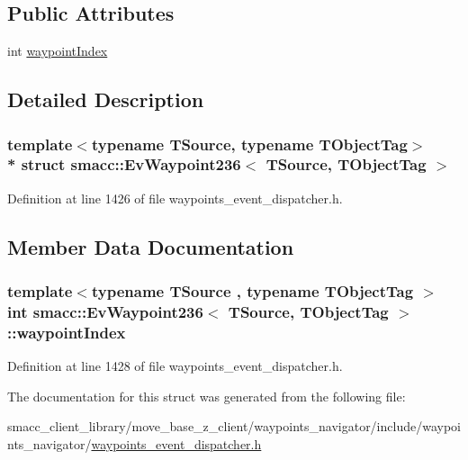 \subsection*{Public Attributes}
\begin{DoxyCompactItemize}
\item 
int \hyperlink{structsmacc_1_1EvWaypoint236_a7405c0387a5ccccb2bb27b5b7e5d84a9}{waypoint\+Index}
\end{DoxyCompactItemize}


\subsection{Detailed Description}
\subsubsection*{template$<$typename T\+Source, typename T\+Object\+Tag$>$\\*
struct smacc\+::\+Ev\+Waypoint236$<$ T\+Source, T\+Object\+Tag $>$}



Definition at line 1426 of file waypoints\+\_\+event\+\_\+dispatcher.\+h.



\subsection{Member Data Documentation}
\subsubsection[{\texorpdfstring{waypoint\+Index}{waypointIndex}}]{\setlength{\rightskip}{0pt plus 5cm}template$<$typename T\+Source , typename T\+Object\+Tag $>$ int {\bf smacc\+::\+Ev\+Waypoint236}$<$ T\+Source, T\+Object\+Tag $>$\+::waypoint\+Index}\hypertarget{structsmacc_1_1EvWaypoint236_a7405c0387a5ccccb2bb27b5b7e5d84a9}{}\label{structsmacc_1_1EvWaypoint236_a7405c0387a5ccccb2bb27b5b7e5d84a9}


Definition at line 1428 of file waypoints\+\_\+event\+\_\+dispatcher.\+h.



The documentation for this struct was generated from the following file\+:\begin{DoxyCompactItemize}
\item 
smacc\+\_\+client\+\_\+library/move\+\_\+base\+\_\+z\+\_\+client/waypoints\+\_\+navigator/include/waypoints\+\_\+navigator/\hyperlink{waypoints__event__dispatcher_8h}{waypoints\+\_\+event\+\_\+dispatcher.\+h}\end{DoxyCompactItemize}
